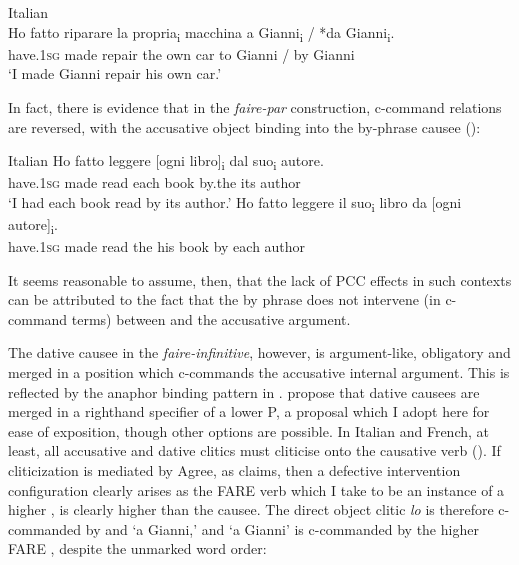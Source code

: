 \documentclass[output=paper,colorlinks,citecolor=brown,nonflat]{langsci/langscibook}
\begin{document}
\ea%
    \label{ex:sheehan:20}
    Italian \citep{Burzio1986}\\
    \gll    Ho   fatto   riparare   la   propria\textsubscript{i} macchina  a  Gianni\textsubscript{i} / *da   Gianni\textsubscript{i}.\\
            have.\textsc{1sg}   made   repair   the  own   car   to   Gianni /  by   Gianni\\
    \glt    ‘I made Gianni repair his own car.’
\z

In fact, there is evidence that in the \textit{faire-par} construction, c-command relations are reversed, with the accusative object binding into the by-phrase causee (\citealt{SheehanCyrino2016}):

\ea%
    \label{ex:sheehan:21}
    Italian \citep[286]{SheehanCyrino2016}
    \ea\label{ex:sheehan:21a}
    \gll    Ho   fatto   leggere [ogni   libro]\textsubscript{i} dal   suo\textsubscript{i}   autore.\\
            have.\textsc{1sg}   made   read   {\db}each book   by.the   its   author\\
    \glt    ‘I had each book read by its author.’
    \ex\label{ex:sheehan:21b}
    \gll    *Ho   fatto   leggere   il  suo\textsubscript{i} libro   da   [ogni  autore]\textsubscript{i}.\\
            have.\textsc{1sg}   made   read   the  his   book   by   {\db}each   author\\
    \z
\z

It seems reasonable to assume, then, that the lack of PCC effects in such contexts can be attributed to the fact that the by phrase does not intervene (in c-command terms) between \liv and the accusative argument.

The dative causee in the \textit{faire-infinitive}, however, is argument-like, obligatory and merged in a position which c-commands the accusative internal argument. This is reflected by the anaphor binding pattern in . \citet{FolliHarley2007} propose that dative causees are merged in a righthand specifier of a lower \liv P, a proposal which I adopt here for ease of exposition, though other options are possible. In Italian and French, at least, all accusative and dative clitics must cliticise onto the causative verb (\citealt{Kayne1975, Burzio1986, Guasti1993}). If cliticization is mediated by Agree, as \citet{Preminger2019} claims, then a defective intervention configuration clearly arises as the FARE verb which I take to be an instance of a higher \liv , is clearly higher than the causee. The direct object clitic \textit{lo} is therefore c-commanded by \liv and ‘a Gianni,’ and ‘a Gianni’ is c-commanded by the higher FARE \liv , despite the unmarked word order:
\end{document}
